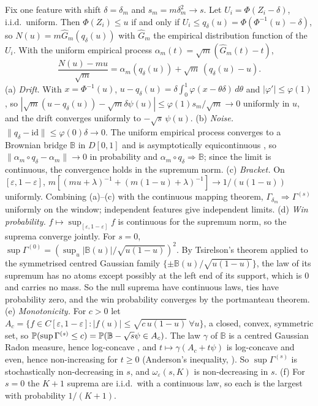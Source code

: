 Fix one feature with shift $\delta = \delta_m$ and $s_m = m\delta_m^2\to s$. Let $U_i = \Phi(Z_i - \delta)$, i.i.d.\ uniform. Then $\Phi(Z_i)\le u$ if and only if $U_i \le q_\delta(u) = \Phi(\Phi^{-1}(u)-\delta)$, so $N(u) = m\hat G_m(q_\delta(u))$ with $\hat G_m$ the empirical distribution function of the $U_i$. With the uniform empirical process $\alpha_m(t) = \sqrt m(\hat G_m(t) - t)$,
\[
  \frac{N(u) - mu}{\sqrt m} = \alpha_m(q_\delta(u)) + \sqrt m\,(q_\delta(u) - u).
\]
(a) \emph{Drift.} With $x = \Phi^{-1}(u)$, $u - q_\delta(u) = \delta\int_0^1\varphi(x-\theta\delta)\,d\theta$ and $|\varphi'|\le\varphi(1)$, so $|\sqrt m(u-q_\delta(u)) - \sqrt m\delta\psi(u)| \le \varphi(1)s_m/\sqrt m \to 0$ uniformly in $u$, and the drift converges uniformly to $-\sqrt s\,\psi(u)$.
(b) \emph{Noise.} $\|q_\delta - \mathrm{id}\| \le \varphi(0)\delta\to 0$. The uniform empirical process converges to a Brownian bridge $\mathbb B$ in $D[0,1]$ and is asymptotically equicontinuous \citep{shorack1986empirical,billingsley1999convergence}, so $\|\alpha_m\circ q_\delta - \alpha_m\|\to 0$ in probability and $\alpha_m\circ q_\delta\Rightarrow\mathbb B$; since the limit is continuous, the convergence holds in the supremum norm.
(c) \emph{Bracket.} On $[\varepsilon,1-\varepsilon]$, $m[(mu+\lambda)^{-1} + (m(1-u)+\lambda)^{-1}] \to 1/(u(1-u))$ uniformly. Combining (a)--(c) with the continuous mapping theorem, $\Gamma_{\delta_m}\Rightarrow\Gamma^{(s)}$ uniformly on the window; independent features give independent limits.
(d) \emph{Win probability.} $f\mapsto\sup_{[\varepsilon,1-\varepsilon]}f$ is continuous for the supremum norm, so the suprema converge jointly. For $s = 0$, $\sup\Gamma^{(0)} = (\sup_u|\mathbb B(u)|/\sqrt{u(1-u)})^2$. By Tsirelson's theorem \citep{tsirelson1975density,lifshits1995gaussian} applied to the symmetrised centred Gaussian family $\{\pm\mathbb B(u)/\sqrt{u(1-u)}\}$, the law of its supremum has no atoms except possibly at the left end of its support, which is $0$ and carries no mass. So the null suprema have continuous laws, ties have probability zero, and the win probability converges by the portmanteau theorem.
(e) \emph{Monotonicity.} For $c > 0$ let $A_c = \{f\in C[\varepsilon,1-\varepsilon] : |f(u)|\le\sqrt{c\,u(1-u)}\ \forall u\}$, a closed, convex, symmetric set, so $\P(\sup\Gamma^{(s)}\le c) = \P(\mathbb B - \sqrt s\psi\in A_c)$. The law $\gamma$ of $\mathbb B$ is a centred Gaussian Radon measure, hence log-concave \citep{borell1974convex,bogachev1998gaussian}, and $t\mapsto\gamma(A_c + t\psi)$ is log-concave and even, hence non-increasing for $t\ge 0$ (Anderson's inequality, \citealp{anderson1955integral}). So $\sup\Gamma^{(s)}$ is stochastically non-decreasing in $s$, and $\omega_\varepsilon(s,K)$ is non-decreasing in $s$.
(f) For $s = 0$ the $K+1$ suprema are i.i.d.\ with a continuous law, so each is the largest with probability $1/(K+1)$.

